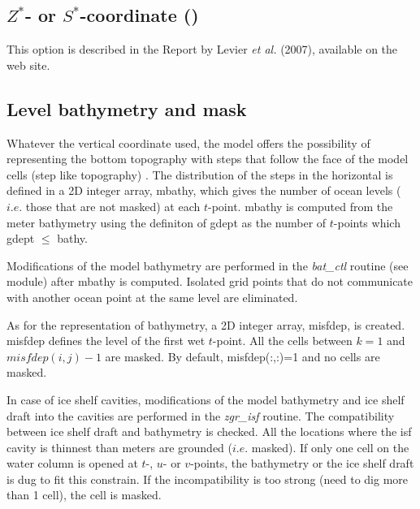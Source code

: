\documentclass[../main/NEMO_manual]{subfiles}
\begin{document}
\subsection{$Z^*$- or $S^*$-coordinate (\protect{}) }
\label{subsec:DOM_zgr_star}

This option is described in the Report by Levier \textit{et al.} (2007), available on the \NEMO web site. 


\subsection{Level bathymetry and mask}
\label{subsec:DOM_msk}

Whatever the vertical coordinate used,
the model offers the possibility of representing the bottom topography with steps that
follow the face of the model cells (step like topography) \citep{Madec_al_JPO96}.
The distribution of the steps in the horizontal is defined in a 2D integer array, mbathy,
which gives the number of ocean levels ($i.e.$ those that are not masked) at each $t$-point.
mbathy is computed from the meter bathymetry using the definiton of gdept as
the number of $t$-points which gdept $\leq$ bathy.

Modifications of the model bathymetry are performed in the \textit{bat\_ctl} routine (see  module) after
mbathy is computed.
Isolated grid points that do not communicate with another ocean point at the same level are eliminated.

As for the representation of bathymetry, a 2D integer array, misfdep, is created.
misfdep defines the level of the first wet $t$-point.
All the cells between $k=1$ and $misfdep(i,j)-1$ are masked.
By default, misfdep(:,:)=1 and no cells are masked.

In case of ice shelf cavities, modifications of the model bathymetry and ice shelf draft into 
the cavities are performed in the \textit{zgr\_isf} routine.
The compatibility between ice shelf draft and bathymetry is checked. 
All the locations where the isf cavity is thinnest than  meters are grounded ($i.e.$ masked). 
If only one cell on the water column is opened at $t$-, $u$- or $v$-points,
the bathymetry or the ice shelf draft is dug to fit this constrain.
If the incompatibility is too strong (need to dig more than 1 cell), the cell is masked.\\ 
\end{document}
